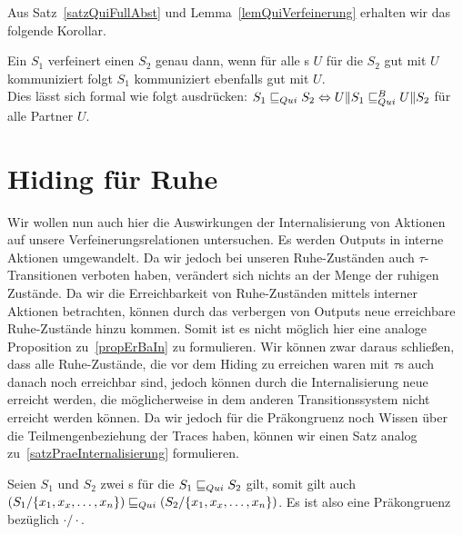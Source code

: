 Aus Satz~\ref{satzQuiFullAbst} und Lemma~\ref{lemQuiVerfeinerung} erhalten wir
das folgende Korollar.

\begin{kor}
  Ein \EIO{} $S_1$ verfeinert einen \EIO{} $S_2$ genau dann, wenn für alle
  \EIO{}s $U$ für die $S_2$ gut mit $U$ kommuniziert folgt $S_1$ kommuniziert
  ebenfalls gut mit $U$.\\
  Dies lässt sich formal wie folgt ausdrücken: $S_1\sqsubseteq _{Qui} S_2\Leftrightarrow
  U\|S_1\sqsubseteq _{Qui}^B U\|S_2$ für alle Partner $U$.
\end{kor}

\section{Hiding für Ruhe}

Wir wollen nun auch hier die Auswirkungen der Internalisierung von Aktionen auf
unsere Verfeinerungsrelationen untersuchen. Es werden Outputs in interne
Aktionen umgewandelt. Da wir jedoch bei unseren Ruhe-Zuständen auch
$\tau$-Transitionen verboten haben, verändert sich nichts an der Menge der ruhigen
Zustände. Da wir die Erreichbarkeit von Ruhe-Zuständen mittels interner Aktionen
betrachten, können durch das verbergen von Outputs neue erreichbare
Ruhe-Zustände hinzu kommen. Somit ist es nicht möglich hier eine analoge
Proposition zu~\ref{propErBaIn} zu formulieren. Wir können zwar daraus
schließen, dass alle Ruhe-Zustände, die vor dem Hiding zu erreichen waren mit
$\tau$s auch danach noch erreichbar sind, jedoch können durch die
Internalisierung neue erreicht werden, die möglicherweise in dem anderen
Transitionssystem nicht erreicht werden können. Da wir jedoch für die
Präkongruenz \QRel{} noch Wissen über die Teilmengenbeziehung der Traces haben,
können wir einen Satz analog zu~\ref{satzPraeInternalisierung} formulieren.

\begin{satz}
  \label{satzPraeInterQui}
  Seien $S_1$ und $S_2$ zwei \EIO{}s für die $S_1\sqsubseteq _{Qui} S_2$ gilt, somit gilt
  auch $(S_1/\{x_1,x_x,\dots ,x_n\})\sqsubseteq _{Qui} (S_2/\{x_1,x_x,\dots ,x_n\})$. Es
  ist also \QRel{} eine Präkongruenz bezüglich $\cdot /\cdot$.
\end{satz}

